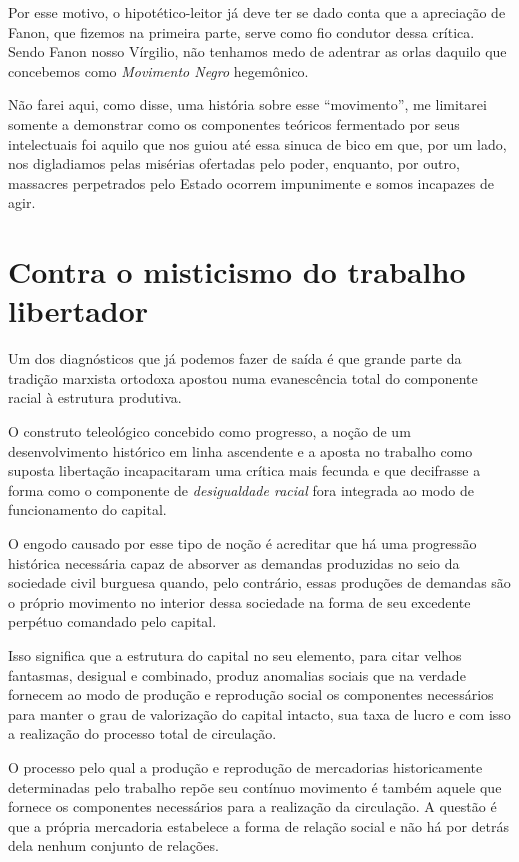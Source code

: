 Por esse motivo, o hipotético-leitor já deve ter se dado conta que a
apreciação de Fanon, que fizemos na primeira parte, serve como fio
condutor dessa crítica. Sendo Fanon nosso Vírgilio, não tenhamos medo de
adentrar as orlas daquilo que concebemos como \emph{Movimento Negro}
hegemônico.

Não farei aqui, como disse, uma história sobre esse ``movimento'', me
limitarei somente a demonstrar como os componentes teóricos fermentado
por seus intelectuais foi aquilo que nos guiou até essa sinuca de bico
em que, por um lado, nos digladiamos pelas misérias ofertadas pelo
poder, enquanto, por outro, massacres perpetrados pelo Estado ocorrem
impunimente e somos incapazes de agir.

\chapter{Contra o misticismo do trabalho libertador}

Um dos diagnósticos que já podemos fazer de saída é que grande parte da
tradição marxista ortodoxa apostou numa evanescência total do componente
racial à estrutura produtiva.

O construto teleológico concebido como progresso, a noção de um
desenvolvimento histórico em linha ascendente e a aposta no trabalho
como suposta libertação incapacitaram uma crítica mais fecunda e que
decifrasse a forma como o componente de \emph{desigualdade racial} fora
integrada ao modo de funcionamento do capital.

O engodo causado por esse tipo de noção é acreditar que há uma
progressão histórica necessária capaz de absorver as demandas produzidas
no seio da sociedade civil burguesa quando, pelo contrário, essas
produções de demandas são o próprio movimento no interior dessa
sociedade na forma de seu excedente perpétuo comandado pelo capital.

Isso significa que a estrutura do capital no seu elemento, para citar
velhos fantasmas, desigual e combinado, produz anomalias sociais que na
verdade fornecem ao modo de produção e reprodução social os componentes
necessários para manter o grau de valorização do capital intacto, sua
taxa de lucro e com isso a realização do processo total de circulação.

O processo pelo qual a produção e reprodução de mercadorias
historicamente determinadas pelo trabalho repõe seu contínuo movimento é
também aquele que fornece os componentes necessários para a realização
da circulação. A questão é que a própria mercadoria estabelece a forma
de relação social e não há por detrás dela nenhum conjunto de relações.

